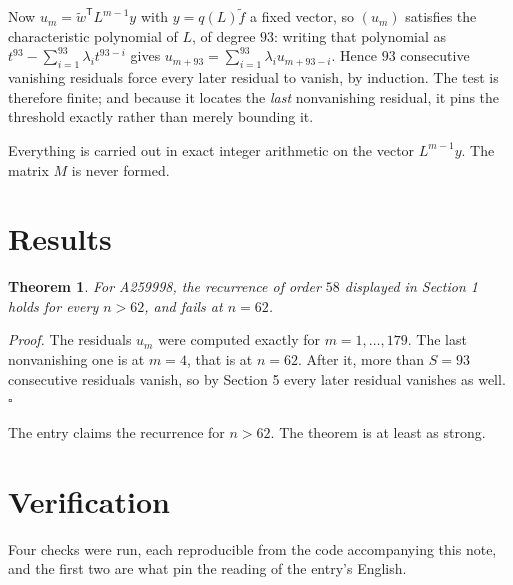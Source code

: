 \documentclass[11pt]{article}
\newtheorem{theorem}{Theorem}
\theoremstyle{definition}
\begin{document}
Now $u_m = \tilde w^{\mathsf T} L^{m-1} y$ with $y = q(L)\tilde f$ a fixed vector, so $(u_m)$ satisfies the characteristic polynomial of $L$, of degree $93$: writing that polynomial as $t^{93} - \sum_{i=1}^{93} \lambda_i t^{93-i}$ gives $u_{m+93} = \sum_{i=1}^{93} \lambda_i u_{m+93-i}$. Hence $93$ consecutive vanishing residuals force every later residual to vanish, by induction. The test is therefore finite; and because it locates the {\itshape last} nonvanishing residual, it pins the threshold exactly rather than merely bounding it.

Everything is carried out in exact integer arithmetic on the vector $L^{m-1}y$. The matrix $M$ is never formed.

\section{Results}

\begin{theorem} For A259998, the recurrence of order $58$ displayed in Section 1 holds for every $n > 62$, and fails at $n = 62$.\end{theorem}

{\itshape Proof.} The residuals $u_m$ were computed exactly for $m = 1,\dots,179$. The last nonvanishing one is at $m = 4$, that is at $n = 62$. After it, more than $S = 93$ consecutive residuals vanish, so by Section 5 every later residual vanishes as well. $\square$

The entry claims the recurrence for $n > 62$. The theorem is at least as strong.

\section{Verification}

Four checks were run, each reproducible from the code accompanying this note, and the first two are what pin the reading of the entry's English.
\end{document}
